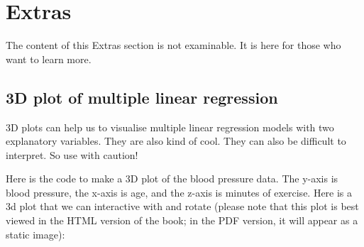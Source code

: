 \documentclass[
  letterpaper,
  8pt,
  a4paper]{book}
\begin{document}
\section*{Extras}\label{extras-4}


\begin{tcolorbox}[enhanced jigsaw, arc=.35mm, bottomrule=.15mm, bottomtitle=1mm, breakable, colback=white, colbacktitle=quarto-callout-note-color!10!white, colframe=quarto-callout-note-color-frame, coltitle=black, left=2mm, leftrule=.75mm, opacityback=0, opacitybacktitle=0.6, rightrule=.15mm, title=\textcolor{quarto-callout-note-color}{\faInfo}\hspace{0.5em}{Note}, titlerule=0mm, toprule=.15mm, toptitle=1mm]

The content of this Extras section is not examinable. It is here for
those who want to learn more.

\end{tcolorbox}

\subsection*{3D plot of multiple linear
regression}\label{d-plot-of-multiple-linear-regression}

3D plots can help us to visualise multiple linear regression models with
two explanatory variables. They are also kind of cool. They can also be
difficult to interpret. So use with caution!

Here is the code to make a 3D plot of the blood pressure data. The
y-axis is blood pressure, the x-axis is age, and the z-axis is minutes
of exercise. Here is a 3d plot that we can interactive with and rotate
(please note that this plot is best viewed in the HTML version of the
book; in the PDF version, it will appear as a static image):
\end{document}
